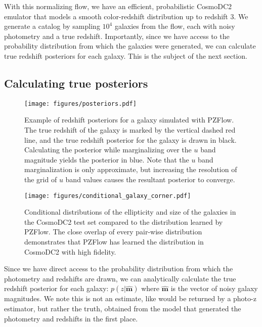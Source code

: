 \documentclass[twocolumn,twocolappendix]{aastex631}
\begin{document}
With this normalizing flow, we have an efficient, probabilistic CosmoDC2 emulator that models a smooth color-redshift distribution up to redshift 3.
We generate a catalog by sampling $10^4$ galaxies from the flow, each with noisy photometry and a true redshift.
Importantly, since we have access to the probability distribution from which the galaxies were generated, we can calculate true redshift posteriors for each galaxy.
This is the subject of the next section.

\subsection{Calculating true posteriors}
\label{sec:true-posteriors}

\begin{figure}[t]
    \begin{centering}
        \texttt{[image: figures/posteriors.pdf]}
        \caption{
            Example of redshift posteriors for a galaxy simulated with PZFlow.
            The true redshift of the galaxy is marked by the vertical dashed red line, and the true redshift posterior for the galaxy is drawn in black.
            Calculating the posterior while marginalizing over the $u$ band magnitude yields the posterior in blue.
            Note that the $u$ band marginalization is only approximate, but increasing the resolution of the grid of $u$ band values causes the resultant posterior to converge.
        }
        \label{fig:posteriors}
    \end{centering}
\end{figure}

\begin{figure*}[t]
    \begin{centering}
        \texttt{[image: figures/conditional\_galaxy\_corner.pdf]}
        \caption{
            Conditional distributions of the ellipticity and size of the galaxies in the CosmoDC2 test set compared to the distribution learned by PZFlow.
            The close overlap of every pair-wise distribution demonstrates that PZFlow has learned the distribution in CosmoDC2 with high fidelity.
        }
        \label{fig:conditional-corner}
    \end{centering}
\end{figure*}

Since we have direct access to the probability distribution from which the photometry and redshifts are drawn, we can analytically calculate the true redshift posterior for each galaxy: $p(z|\mathbf{\hat{m}})$ where $\mathbf{\hat{m}}$ is the vector of noisy galaxy magnitudes.
We note this is not an estimate, like would be returned by a photo-z estimator, but rather the truth, obtained from the model that generated the photometry and redshifts in the first place.
\end{document}
